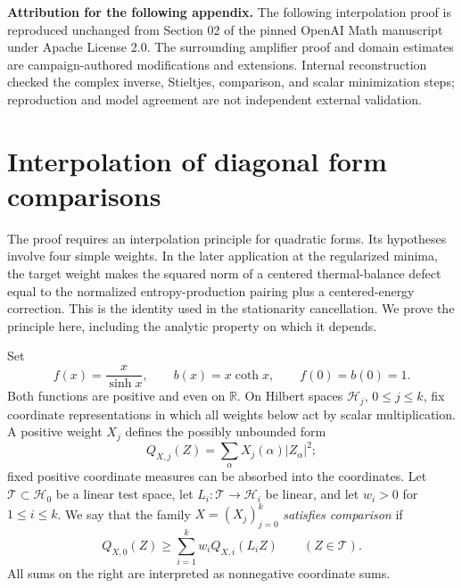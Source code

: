 \documentclass[11pt]{article}
\newcommand{\R}{\mathbb R}
\theoremstyle{remark}\newtheorem{remark}[theorem]{Remark}
\begin{document}
\appendix
\noindent\textbf{Attribution for the following appendix.} The following interpolation proof is reproduced unchanged from Section 02 of the pinned OpenAI Math manuscript under Apache License 2.0. The surrounding amplifier proof and domain estimates are campaign-authored modifications and extensions. Internal reconstruction checked the complex inverse, Stieltjes, comparison, and scalar minimization steps; reproduction and model agreement are not independent external validation.

\section{Interpolation of diagonal form comparisons}\label{sec:interpolation}

The proof requires an interpolation principle for quadratic forms. Its
hypotheses involve four simple weights. In the later application at the
regularized minima, the target weight makes the squared norm of a centered
thermal-balance defect equal to the normalized entropy-production pairing
plus a centered-energy correction. This is the identity used in the
stationarity cancellation. We prove the principle here, including the
analytic property on which it depends.

Set
\begin{equation}\label{int:fb}
 f(x)=\frac{x}{\sinh x},\qquad b(x)=x\coth x,\qquad f(0)=b(0)=1.
\end{equation}
Both functions are positive and even on $\R$.  On Hilbert spaces
$\mathcal H_j$, $0\le j\le k$, fix coordinate representations in which all
weights below act by scalar multiplication.  A positive weight $X_j$
defines the possibly unbounded form
\[
 Q_{X,j}(Z)=\sum_{\alpha}X_j(\alpha)|Z_\alpha|^2;
\]
fixed positive coordinate measures can be absorbed into the coordinates.
Let $\mathcal T\subset\mathcal H_0$ be a linear test space, let
$L_i:\mathcal T\to\mathcal H_i$ be linear, and let $w_i>0$ for $1\le i\le k$.
We say that the family $X=(X_j)_{j=0}^k$ \emph{satisfies comparison} if
\begin{equation}\label{int:comparison}
 Q_{X,0}(Z)\ge\sum_{i=1}^k w_i Q_{X,i}(L_iZ)
 \qquad(Z\in\mathcal T).
\end{equation}
All sums on the right are interpreted as nonnegative coordinate sums.
\end{document}
